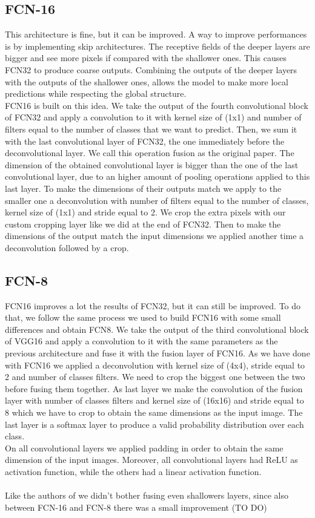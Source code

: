 \documentclass[10pt,twocolumn,letterpaper]{article}
\begin{document}
\subsection{FCN-16}
This architecture is fine, but it can be improved. A way to improve performances is by implementing skip architectures. The receptive fields of the deeper layers are bigger and see more pixels if compared with the shallower ones. This causes FCN32 to produce coarse outputs. Combining the outputs of the deeper layers with the outputs of the shallower ones, allows the model to make more local predictions while respecting the global structure. \\
FCN16 is built on this idea. We take the output of the fourth convolutional block of FCN32 and apply a convolution to it with kernel size of (1x1) and number of filters equal to the number of classes that we want to predict. Then, we sum it with the last convolutional layer of FCN32, the one immediately before the deconvolutional layer. We call this operation fusion  as the original paper. The dimension of the obtained convolutional layer is bigger than the one of the last convolutional layer, due to an higher amount of pooling operations applied to this last layer. 
To make the dimensions of their outputs match we apply to the smaller one a deconvolution with number of filters equal to the number of classes, kernel size of (1x1) and stride equal to 2. We crop the extra pixels with our custom cropping layer like we did at the end of FCN32. Then to make the dimensions of the output match the input dimensions we applied another time a deconvolution followed by a crop.
\subsection{FCN-8}
FCN16 improves a lot the results of FCN32, but it can still be improved. To do that, we follow the same process we used to build FCN16 with some small differences and obtain FCN8.
We take the output of the third convolutional block of VGG16 and apply a convolution to it with the same parameters as the previous architecture and fuse it with the fusion layer of FCN16. As we have done with FCN16 we applied a deconvolution with kernel size of (4x4), stride equal to 2 and number of classes filters. We need to crop the biggest one between the two before fusing them together. As last layer we make the convolution of the fusion layer with number of classes filters and kernel size of (16x16) and stride equal to 8 which we have to crop to obtain the same dimensions as the input image. The last layer is a softmax layer to produce a valid probability distribution over each class. \\
On all convolutional layers we applied padding in order to obtain the same dimension of the input images. Moreover, all convolutional layers had ReLU as activation function, while the others had a linear activation function. \\ \\
Like the authors of \cite{projectPaper} we didn't bother fusing even shallowers layers, since also between FCN-16 and FCN-8 there was a small improvement (TO DO)
\end{document}
